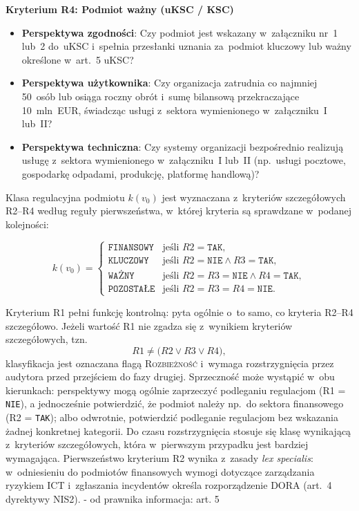 \noindent\textbf{Kryterium R4: Podmiot ważny (uKSC / KSC)}

\begin{itemize}
  \item \textbf{Perspektywa zgodności}: Czy podmiot jest wskazany
w~załączniku nr~1 lub~2 do~uKSC i~spełnia przesłanki uznania
za~podmiot kluczowy lub ważny określone w~art.~5 uKSC?
  \item \textbf{Perspektywa użytkownika}: Czy organizacja zatrudnia co najmniej 50~osób lub osiąga roczny obrót i~sumę bilansową przekraczające 10~mln~EUR, świadcząc usługi z~sektora wymienionego w~załączniku~I lub~II?
  \item \textbf{Perspektywa techniczna}: Czy systemy organizacji bezpośrednio realizują usługę z~sektora wymienionego w~załączniku~I lub~II (np.\ usługi pocztowe, gospodarkę odpadami, produkcję, platformę handlową)?
\end{itemize}

Klasa regulacyjna podmiotu $k(v_0)$ jest wyznaczana z~kryteriów szczegółowych R2--R4 według reguły pierwszeństwa, w~której kryteria są sprawdzane w~podanej kolejności:

\begin{equation}
k(v_0) =
\begin{cases}
\texttt{FINANSOWY} & \text{jeśli } R2 = \texttt{TAK}, \\
\texttt{KLUCZOWY}  & \text{jeśli } R2 = \texttt{NIE} \wedge R3 = \texttt{TAK}, \\
\texttt{WAŻNY}     & \text{jeśli } R2 = R3 = \texttt{NIE} \wedge R4 = \texttt{TAK}, \\
\texttt{POZOSTAŁE} & \text{jeśli } R2 = R3 = R4 = \texttt{NIE}.
\end{cases}
\label{eq:klasa-podmiotu}
\end{equation}

\noindent Kryterium R1 pełni funkcję kontrolną: pyta ogólnie o~to samo, co kryteria R2--R4 szczegółowo. Jeżeli wartość R1 nie zgadza się z~wynikiem kryteriów szczegółowych, tzn.
\[
R1 \neq \bigl(R2 \vee R3 \vee R4\bigr),
\]
klasyfikacja jest oznaczana flagą \textsc{Rozbieżność} i~wymaga rozstrzygnięcia przez audytora przed przejściem do fazy drugiej. Sprzeczność może wystąpić w~obu kierunkach: perspektywy mogą ogólnie zaprzeczyć podleganiu regulacjom (R1 = \texttt{NIE}), a jednocześnie potwierdzić, że podmiot należy np.\ do sektora finansowego (R2 = \texttt{TAK}); albo odwrotnie, potwierdzić podleganie regulacjom bez wskazania żadnej konkretnej kategorii. Do czasu rozstrzygnięcia stosuje się klasę wynikającą z~kryteriów szczegółowych, która w~pierwszym przypadku jest bardziej wymagająca. Pierwszeństwo kryterium R2 wynika z~zasady \textit{lex specialis}: w~odniesieniu do podmiotów finansowych wymogi dotyczące zarządzania ryzykiem ICT i~zgłaszania incydentów określa rozporządzenie DORA (art.~4 dyrektywy NIS2).
 - od prawnika informacja: art. 5

